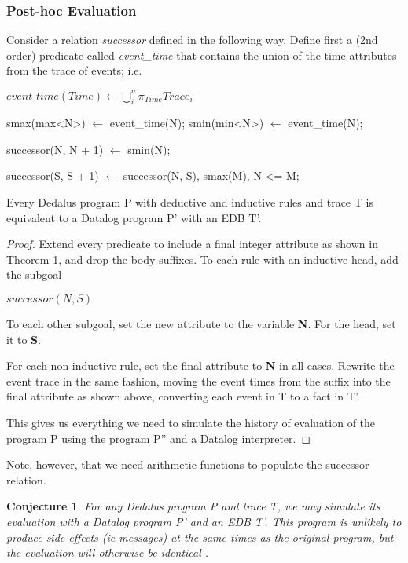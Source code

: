 \subsubsection{Post-hoc Evaluation}

Consider a relation \emph{successor} defined in the following way.
Define first a (2nd order) predicate called \emph{event\_time} 
that contains the union of the time attributes from the trace of events; i.e.

$event\_time(Time) \leftarrow \displaystyle\bigcup_{i}^n \pi_{Time}Trace_{i}$

\begin{Dedalus}
smax(max<N>) \(\leftarrow\) event\_time(N);
smin(min<N>) \(\leftarrow\) event\_time(N);

successor(N, N + 1) \(\leftarrow\) smin(N);

successor(S, S + 1) \(\leftarrow\) 
    successor(N, S),
    smax(M),
    N <= M;
\end{Dedalus}


\begin{theorem}
Every Dedalus program P with deductive and inductive rules and trace T is equivalent to a Datalog program P' with an EDB T'.
\end{theorem}

\begin{proof}

Extend every predicate to include a final integer attribute as shown in Theorem 1, and drop the body suffixes.  To each rule 
with an inductive head, add the subgoal 

$successor(N, S)$

To each other subgoal, set the new attribute to the variable \textbf{N}.  For the head, set it to \textbf{S}.  

For each non-inductive rule, set the final attribute to \textbf{N} in all cases.  Rewrite the event trace in the same fashion, 
moving the event times from the suffix into the final attribute as shown above, converting each event in T to a fact in T'.


This gives us everything we need to simulate the history of evaluation of the program P using the program P'' and a Datalog interpreter.

\end{proof}

Note, however, that we need arithmetic functions to populate the successor relation.

\newtheorem{conjecture}{Conjecture}
\begin{conjecture}
For any Dedalus program P and trace T, we may simulate its evaluation with a Datalog program P' and an EDB T'.  This program
is unlikely to produce side-effects (ie messages) at the same times as the original program, but the evaluation will otherwise be identical .
\end{conjecture}

